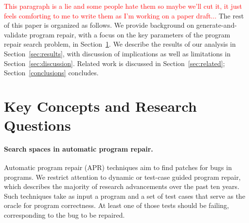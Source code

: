 \documentclass[sigconf, timestamp-false, anonymous=true]{acmart}
\newcommand\todo[1]{\textcolor{red}{#1}}
\begin{document}
\todo{This paragraph is a lie and some people hate them so maybe we'll cut it,
  it just feels comforting to me to write them as I'm working on a paper draft...}
The rest of this paper is organized as follows.  We provide background on
generate-and-validate program repair, with a focus on the key parameters of the
program repair search problem, in Section~\ref{sec:background}.  We describe the results of our analysis in
Section~\ref{sec:results}, with discussion of implications as well as
limitations in Section~\ref{sec:discussion}.  Related work is discussed in
Section~\ref{sec:related}; Section~\ref{conclusions} concludes.

\section{Key Concepts and Research Questions}
\label{sec:background}

\paragraph{Search spaces in automatic program repair.} Automatic program repair (APR) techniques aim to find patches for bugs in
programs.  We restrict attention to dynamic or test-case guided program repair,
which describes the majority of research advancements over the past ten years.
Such techniques take as input a program and a set of test cases that serve as
the oracle for program correctness.  At least one of those tests should be
failing, corresponding to the bug to be repaired.
\end{document}
